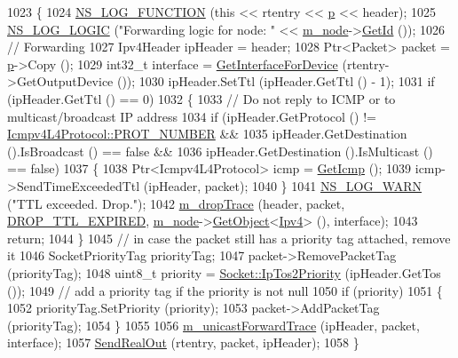 \begin{DoxyCode}
1023 \{
1024   \hyperlink{log-macros-disabled_8h_a90b90d5bad1f39cb1b64923ea94c0761}{NS\_LOG\_FUNCTION} (\textcolor{keyword}{this} << rtentry << \hyperlink{lte__link__budget_8m_ac9de518908a968428863f829398a4e62}{p} << header);
1025   \hyperlink{group__logging_ga88acd260151caf2db9c0fc84997f45ce}{NS\_LOG\_LOGIC} (\textcolor{stringliteral}{"Forwarding logic for node: "} << \hyperlink{classns3_1_1Ipv4L3Protocol_ad2cc5076c247724f1e99b398edc1965a}{m\_node}->\hyperlink{classns3_1_1Node_aaf49b64a843565ce3812326313b370ac}{GetId} ());
1026   \textcolor{comment}{// Forwarding}
1027   Ipv4Header ipHeader = header;
1028   Ptr<Packet> packet = \hyperlink{lte__link__budget_8m_ac9de518908a968428863f829398a4e62}{p}->Copy ();
1029   int32\_t \textcolor{keyword}{interface }= \hyperlink{classns3_1_1Ipv4L3Protocol_a4640baab6b3879020a4146f17e293321}{GetInterfaceForDevice} (rtentry->GetOutputDevice ());
1030   ipHeader.SetTtl (ipHeader.GetTtl () - 1);
1031   \textcolor{keywordflow}{if} (ipHeader.GetTtl () == 0)
1032     \{
1033       \textcolor{comment}{// Do not reply to ICMP or to multicast/broadcast IP address }
1034       \textcolor{keywordflow}{if} (ipHeader.GetProtocol () != \hyperlink{classns3_1_1Icmpv4L4Protocol_a3419e4f8f36662059a64fcb29c3384ad}{Icmpv4L4Protocol::PROT\_NUMBER} && 
1035           ipHeader.GetDestination ().IsBroadcast () == \textcolor{keyword}{false} &&
1036           ipHeader.GetDestination ().IsMulticast () == \textcolor{keyword}{false})
1037         \{
1038           Ptr<Icmpv4L4Protocol> icmp = \hyperlink{classns3_1_1Ipv4L3Protocol_a4dd2b3a24817ed50e7a6f41a5657551c}{GetIcmp} ();
1039           icmp->SendTimeExceededTtl (ipHeader, packet);
1040         \}
1041       \hyperlink{group__logging_gade7208b4009cdf0e25783cd26766f559}{NS\_LOG\_WARN} (\textcolor{stringliteral}{"TTL exceeded.  Drop."});
1042       \hyperlink{classns3_1_1Ipv4L3Protocol_a80984e2de6a2562b04195b975014cb1b}{m\_dropTrace} (header, packet, \hyperlink{classns3_1_1Ipv4L3Protocol_a05e7403d60c79529257c4cffdd994da1a95ecb5b7c1affd7ca7a6d3d34c38cd40}{DROP\_TTL\_EXPIRED}, 
      \hyperlink{classns3_1_1Ipv4L3Protocol_ad2cc5076c247724f1e99b398edc1965a}{m\_node}->\hyperlink{classns3_1_1Object_a13e18c00017096c8381eb651d5bd0783}{GetObject}<\hyperlink{classns3_1_1Ipv4_a1c15284fe630c76e0c9c75a97f1ff234}{Ipv4}> (), interface);
1043       \textcolor{keywordflow}{return};
1044     \}
1045   \textcolor{comment}{// in case the packet still has a priority tag attached, remove it}
1046   SocketPriorityTag priorityTag;
1047   packet->RemovePacketTag (priorityTag);
1048   uint8\_t priority = \hyperlink{classns3_1_1Socket_a81564620cc94d291f1dc5d79b2f13b4a}{Socket::IpTos2Priority} (ipHeader.GetTos ());
1049   \textcolor{comment}{// add a priority tag if the priority is not null}
1050   \textcolor{keywordflow}{if} (priority)
1051     \{
1052       priorityTag.SetPriority (priority);
1053       packet->AddPacketTag (priorityTag);
1054     \}
1055 
1056   \hyperlink{classns3_1_1Ipv4L3Protocol_acc97efd317fd7e0c1a65c6247fa6537a}{m\_unicastForwardTrace} (ipHeader, packet, interface);
1057   \hyperlink{classns3_1_1Ipv4L3Protocol_ac1baf310b12bbc564d0766061ecca323}{SendRealOut} (rtentry, packet, ipHeader);
1058 \}
\end{DoxyCode}


